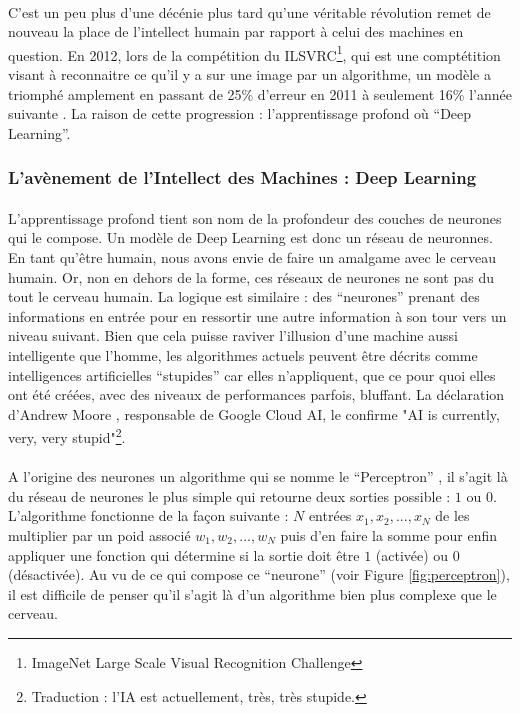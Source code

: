 \documentclass[10pt, french, a4paper]{report}
\begin{document}
\paragraph{}
C'est un peu plus d'une décénie plus tard qu'une véritable révolution remet de nouveau la place de l'intellect humain par rapport à celui des machines en question. En 2012, lors de la compétition du ILSVRC\footnote{ImageNet Large Scale Visual Recognition Challenge}, qui est une comptétition visant à reconnaitre ce qu'il y a sur une image par un algorithme, un modèle a triomphé amplement en passant de 25\% d'erreur en 2011 à seulement 16\% l'année suivante \citep{ILSVRC15}. La raison de cette progression : l'apprentissage profond où ``Deep Learning''.

\subsubsection{L'avènement de l'Intellect des Machines : Deep Learning}

\paragraph{}
L'apprentissage profond tient son nom de la profondeur des couches de neurones qui le compose. Un modèle de Deep Learning est donc un réseau de neuronnes. En tant qu'être humain, nous avons envie de faire un amalgame avec le cerveau humain. Or, non en dehors de la forme, ces réseaux de neurones ne sont pas du tout le cerveau humain. La logique est similaire : des ``neurones'' prenant des informations en entrée pour en ressortir une autre information à son tour vers un niveau suivant. Bien que cela puisse raviver l’illusion d’une machine aussi intelligente que l’homme, les algorithmes actuels peuvent être décrits comme intelligences artificielles ``stupides'' car elles n’appliquent, que ce pour quoi elles ont été créées, avec des niveaux de performances parfois, bluffant. La déclaration d’Andrew Moore \citep{newsflash_ai_2018}, responsable de Google Cloud AI, le confirme "AI is currently, very, very stupid"\footnote{Traduction : l’IA est actuellement, très, très stupide.}.

\paragraph{}
A l'origine des neurones un algorithme qui se nomme le ``Perceptron'' \citep{rosenblatt_perceptron_1958}, il s'agit là du réseau de neurones le plus simple qui retourne deux sorties possible : $1$ ou $0$. L'algorithme fonctionne de la façon suivante : $N$ entrées $x_1, x_2, ..., x_N$ de les multiplier par un poid associé $w_1, w_2, ..., w_N$ puis d'en faire la somme pour enfin appliquer une fonction qui détermine si la sortie doit être $1$ (activée) ou $0$ (désactivée). Au vu de ce qui compose ce ``neurone'' (voir Figure \ref{fig:perceptron}), il est difficile de penser qu'il s'agit là d'un algorithme bien plus complexe que le cerveau.
\end{document}
